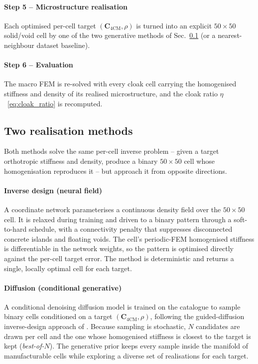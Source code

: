 \documentclass[preprint,12pt]{elsarticle}
\newcommand{\mbf}[1]{\mathbf{#1}}
\begin{document}
\paragraph{Step 5 -- Microstructure realisation} Each optimised per-cell target
$(\mbf{C}_{\mathrm{4CM}},\rho)$ is turned into an explicit $50\times50$
solid/void cell by one of the two generative methods of
Sec.~\ref{subsec:micro_methods} (or a nearest-neighbour dataset baseline).

\paragraph{Step 6 -- Evaluation} The macro FEM is re-solved with every cloak
cell carrying the homogenised stiffness and density of its realised microstructure, and the
cloak ratio $\eta$~\eqref{eq:cloak_ratio} is recomputed.

\subsection{Two realisation methods}\label{subsec:micro_methods}

Both methods solve the same per-cell inverse problem -- given a target
orthotropic stiffness and density, produce a binary $50\times50$ cell whose
homogenisation reproduces it -- but approach it from opposite directions.

\paragraph{Inverse design (neural field)} A coordinate network parameterises a
continuous density field over the $50\times50$ cell. It is relaxed during
training and driven to a binary pattern through a soft-to-hard schedule, with a
connectivity penalty that suppresses disconnected concrete islands and floating
voids. The cell's periodic-FEM homogenised stiffness is differentiable in the
network weights, so the pattern is optimised directly against the per-cell target
error. The method is deterministic and returns a single, locally optimal cell for
each target.

\paragraph{Diffusion (conditional generative)} A conditional denoising diffusion
model is trained on the catalogue to sample binary cells conditioned on a target
$(\mbf{C}_{\mathrm{4CM}},\rho)$, following the guided-diffusion inverse-design
approach of \citet{yang2024}. Because sampling is stochastic, $N$ candidates
are drawn per cell and the one whose homogenised stiffness is closest to the
target is kept (\emph{best-of-$N$}). The generative prior keeps every sample
inside the manifold of manufacturable cells while exploring a diverse set of
realisations for each target.
\end{document}
